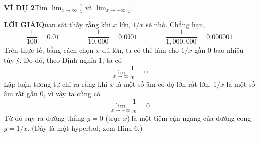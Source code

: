 \begin{minipage}[t]{0.71\textwidth}
    \vspace{0.8em}
    \noindent
    \textbf{\textsf{\color{stewartcyan}VÍ DỤ 2}}\quad Tìm $\displaystyle \lim_{x \to \infty} \frac{1}{x}$ và $\displaystyle \lim_{x \to -\infty} \frac{1}{x}$.

    \vspace{0.3em}
    \noindent
    \textbf{\textsf{\color{stewartcyan}LỜI GIẢI}}\quad Quan sát thấy rằng khi $x$ lớn, $1/x$ sẽ nhỏ. Chẳng hạn,
    \[
    \frac{1}{100} = 0.01 \qquad\qquad \frac{1}{10{,}000} = 0.0001 \qquad\qquad \frac{1}{1{,}000{,}000} = 0.000001
    \]
    Trên thực tế, bằng cách chọn $x$ đủ lớn, ta có thể làm cho $1/x$ gần $0$ bao nhiêu tùy ý. Do đó, theo Định nghĩa 1, ta có
    \[
    \lim_{x \to \infty} \frac{1}{x} = 0
    \]
    Lập luận tương tự chỉ ra rằng khi $x$ là một số âm có độ lớn rất lớn, $1/x$ là một số âm rất gần $0$, vì vậy ta cũng có
    \[
    \lim_{x \to -\infty} \frac{1}{x} = 0
    \]
    Từ đó suy ra đường thẳng $y = 0$ (trục $x$) là một tiệm cận ngang của đường cong $y = 1/x$. (Đây là một hyperbol; xem Hình 6.)\hfill{\color{stewartcyan}\rule{1.1ex}{1.1ex}}
\end{minipage}
